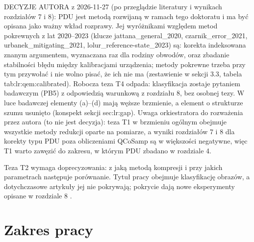 {DECYZJE AUTORA z 2026-11-27 (po przeglądzie literatury i wynikach rozdziałów 7 i 8):
PDU jest metodą rozwijaną w ramach tego doktoratu i ma być opisana jako ważny wkład rozprawy.
Jej wyróżnikami względem metod pokrewnych z lat 2020--2023 (klucze jattana_general_2020, czarnik_error_2021, urbanek_mitigating_2021, lolur_reference-state_2023) są: korekta indeksowana znanym argumentem, wyznaczana raz dla rodziny obwodów, oraz zbadanie stabilności błędu między kalibracjami urządzenia; metody pokrewne trzeba przy tym przywołać i nie wolno pisać, że ich nie ma (zestawienie w sekcji 3.3, tabela tab:lr:qem:calibrated).
Robocza teza T4 odpada: klasyfikacja zostaje pytaniem badawczym (PB5) z odpowiedzią warunkową z rozdziału 8, bez osobnej tezy.
W luce badawczej elementy (a)--(d) mają węższe brzmienie, a element o strukturze szumu usunięto (konspekt sekcji sec:lr:gap).
Uwaga orkiestratora do rozważenia przez autora (to nie jest decyzja): teza T1 w brzmieniu ogólnym obejmuje wszystkie metody redukcji oparte na pomiarze, a wyniki rozdziałów 7 i 8 dla korekty typu PDU poza obliczeniami QCoSamp są w większości negatywne, więc T1 warto zawęzić do zakresu, w którym PDU zbadano w rozdziale 4.

Teza T2 wymaga doprecyzowania: z jaką metodą kompresji i przy jakich parametrach następuje porównanie.
Tytuł pracy obejmuje klasyfikację obrazów, a dotychczasowe artykuły jej nie pokrywają; pokrycie dają nowe eksperymenty opisane w rozdziale 8 .
}

\section{Zakres pracy}\label{sec:introduction:scope}

